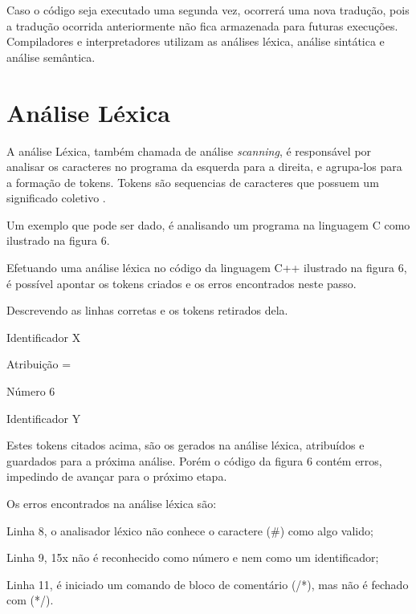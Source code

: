 \documentclass[12pt,oneside,a4paper,chapter=TITLE,section=TITLE,sumario=tradicional]{abntex2}
\begin{document}
Caso o código seja executado uma segunda vez, ocorrerá uma nova tradução, pois a tradução ocorrida anteriormente não fica armazenada para futuras execuções. Compiladores e interpretadores utilizam as análises léxica, análise sintática e análise semântica.

\section{Análise Léxica}
\label{sec:analise-lexica}

A análise Léxica, também chamada de análise \textit{scanning}, é responsável por analisar os caracteres no programa da esquerda para a direita, e agrupa-los para a formação de tokens. Tokens são sequencias de caracteres que possuem um significado coletivo \cite{alfred1995}.

Um exemplo que pode ser dado, é analisando um programa na linguagem C como ilustrado na figura 6.

\begin{figure}[htb]
\end{figure}

Efetuando uma análise léxica no código da linguagem C++ ilustrado na figura 6, é possível apontar os tokens criados e os erros encontrados neste passo. 

Descrevendo as linhas corretas e os tokens retirados dela.

\begin{lista}
	\item Identificador    X 
	\item Atribuição        = 
	\item Número            6 
	\item Identificador    Y
\end{lista}

Estes tokens citados acima, são os gerados na análise léxica, atribuídos e guardados para a próxima análise. Porém o código da figura 6 contém erros, impedindo de avançar para o próximo etapa.

Os erros encontrados na análise léxica são:

\begin{lista}
	\item Linha 8, o analisador léxico não conhece o caractere (\#) como algo valido;
	\item Linha 9, 15x não é reconhecido como número e nem como um identificador;
	\item Linha 11, é iniciado um comando de bloco de comentário (/*), mas não é fechado com (*/).
\end{lista}
\end{document}
